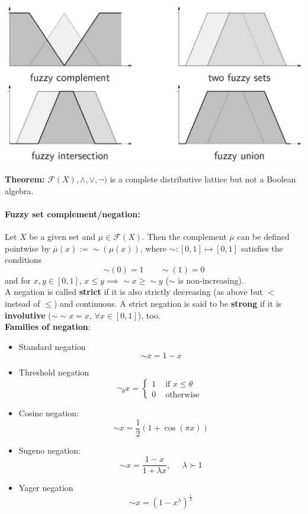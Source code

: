 \begin{center}
	\includegraphics[width=0.8\columnwidth]{img/FS/fop1}
\end{center}

\textbf{Theorem:} $\mathcal{F} (X), \wedge, \vee, \neg)$ is a complete distributive lattice but not a Boolean algebra.

\newpage

\paragraph{Fuzzy set complement/negation:} Let $X$ be a given set and $\mu \in \mathcal{F} (X)$. Then the complement $\overline{\mu}$ can be defined pointwise by $\overline{\mu} (x) := \sim (\mu (x))$, where $\sim: [0, 1] \mapsto [0,1]$ satisfies the conditions
$$ \sim (0) = 1 \;\;\;\;\;\;\; \sim (1) = 0 $$
and for $x,y \in [0,1]$, $x \leq y \implies \sim x \geq \sim y$ ($\sim$ is non-increasing).\\

A negation is called \textbf{strict} if it is also strictly decreasing (as above but $<$ instead of $\leq$) and continuous. A strict negation is said to be \textbf{strong} if it is \textbf{involutive} ($\sim \sim x = x$, $\forall x \in [0,1]$), too.\\

\textbf{Families of negation}: 
\begin{itemize}
	\item Standard negation
	$$ \sim x = 1 - x $$
	\item Threshold negation
	$$ \neg_\theta x = \begin{cases}
		1 & \text{ if } x \leq \theta \\
		0 & \text{ otherwise }
	\end{cases}$$
	\item Cosine negation: 
	$$ \sim x = \frac{1}{2} (1 + \cos (\pi x)) $$
	\item Sugeno negation: 
	$$ \sim x = \frac{1 - x}{1 + \lambda x}, \;\;\;\;\; \lambda \succ 1$$
	\item Yager negation
	$$ \sim x = (1 - x^\lambda)^{\frac{1}{\lambda}} $$
\end{itemize}


